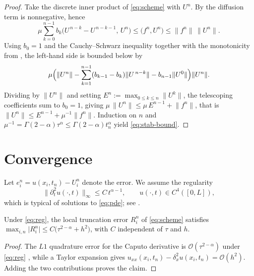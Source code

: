 \documentclass[11pt]{ajam}
\newcommand{\norm}[1]{\lVert #1 \rVert}
\newcommand{\Gam}{\Gamma}
\begin{document}
\begin{proof}
Take the discrete inner product of \eqref{eq:scheme} with $U^n$. By
 the diffusion term is nonnegative, hence
\begin{equation}\label{eq:stab1}
  \mu\sum_{k=0}^{n-1} b_k\bigl(U^{\,n-k}-U^{\,n-k-1},\,U^n\bigr)
  \le \bigl(f^n,U^n\bigr) \le \norm{f^n}\,\norm{U^n}.
\end{equation}
Using $b_0=1$ and the Cauchy--Schwarz inequality together with the
monotonicity from , the left-hand side is bounded below by
\begin{equation}
  \mu\Bigl(\norm{U^n}
  - \sum_{k=1}^{n-1}(b_{k-1}-b_k)\norm{U^{\,n-k}}
  - b_{n-1}\norm{U^0}\Bigr)\norm{U^n}.
\end{equation}
Dividing by $\norm{U^n}$ and setting
$E^n:=\max_{0\le k\le n}\norm{U^k}$, the telescoping coefficients sum to
$b_0=1$, giving $\mu\,\norm{U^n}\le \mu\,E^{n-1}+\norm{f^n}$, that is
$\norm{U^n}\le E^{n-1}+\mu^{-1}\norm{f^n}$. Induction on $n$ and
$\mu^{-1}=\Gam(2-\alpha)\tau^{\alpha}\le \Gam(2-\alpha)t_n^{\alpha}$ yield
\eqref{eq:stab-bound}.
\end{proof}

\section{Convergence}\label{sec:convergence}
Let $e_i^n=u(x_i,t_n)-U_i^n$ denote the error. We assume the regularity
\begin{equation}\label{eq:reg}
  \bigl\lVert \partial_t^{2} u(\cdot,t)\bigr\rVert_{\infty}\le C\,t^{\alpha-1},
  \qquad u(\cdot,t)\in C^4([0,L]),
\end{equation}
which is typical of solutions to \eqref{eq:pde}; see
\citep{StynesORiordanGracia2017,JinLazarovZhou2019}.

\begin{lemma}\label{lem:trunc}
Under \eqref{eq:reg}, the local truncation error $R_i^n$ of
\eqref{eq:scheme} satisfies
$\max_{i,n}\lvert R_i^n\rvert \le C\bigl(\tau^{2-\alpha}+h^2\bigr)$,
with $C$ independent of $\tau$ and $h$.
\end{lemma}

\begin{proof}
The $L1$ quadrature error for the Caputo derivative is
$\mathcal{O}(\tau^{2-\alpha})$ under \eqref{eq:reg}
\citep[Lemma~3.1]{LinXu2007}, while a Taylor expansion gives
$u_{xx}(x_i,t_n)-\delta_x^2 u(x_i,t_n)=\mathcal{O}(h^2)$. Adding the two
contributions proves the claim.
\end{proof}
\end{document}
